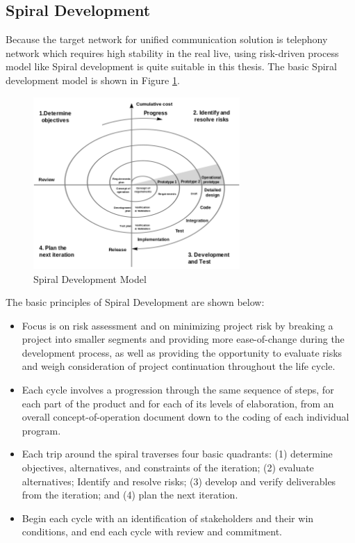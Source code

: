 \subsection{Spiral Development}

\par Because the target network for unified communication solution is telephony network which requires high stability in the real live, using risk-driven process model like Spiral development is quite suitable in this thesis. The basic Spiral development model is shown in Figure \ref{fig:spiral}.

\begin{figure}
	\centering
    	\includegraphics[width=0.70\textwidth,natwidth=610,natheight=642]{figs/Spiral_model.png}
  	\caption{Spiral Development Model}
  	\label{fig:spiral}
\end{figure}

\noindent The basic principles of Spiral Development are shown below\cite{wiki:software_method}:

\begin{itemize}[topsep=-1em,parsep=0em,itemsep=0em]
    \item Focus is on risk assessment and on minimizing project risk by breaking a project into smaller segments and providing more ease-of-change during the development process, as well as providing the opportunity to evaluate risks and weigh consideration of project continuation throughout the life cycle.
    \item Each cycle involves a progression through the same sequence of steps, for each part of the product and for each of its levels of elaboration, from an overall concept-of-operation document down to the coding of each individual program.
    \item Each trip around the spiral traverses four basic quadrants: (1) determine objectives, alternatives, and constraints of the iteration; (2) evaluate alternatives; Identify and resolve risks; (3) develop and verify deliverables from the iteration; and (4) plan the next iteration.
    \item Begin each cycle with an identification of stakeholders and their win conditions, and end each cycle with review and commitment.
\end{itemize}

